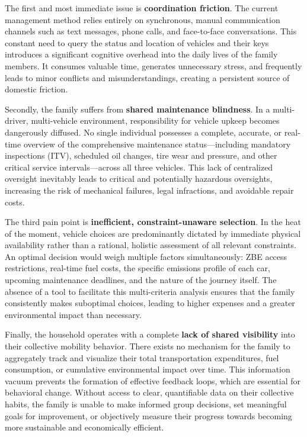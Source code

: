 \textgap

The first and most immediate issue is \textbf{coordination friction}. The current management method relies entirely on synchronous, manual communication channels such as text messages, phone calls, and face-to-face conversations. This constant need to query the status and location of vehicles and their keys introduces a significant cognitive overhead into the daily lives of the family members. It consumes valuable time, generates unnecessary stress, and frequently leads to minor conflicts and misunderstandings, creating a persistent source of domestic friction.

\textgap

Secondly, the family suffers from \textbf{shared maintenance blindness}. In a multi-driver, multi-vehicle environment, responsibility for vehicle upkeep becomes dangerously diffused. No single individual possesses a complete, accurate, or real-time overview of the comprehensive maintenance status—including mandatory inspections (ITV), scheduled oil changes, tire wear and pressure, and other critical service intervals—across all three vehicles. This lack of centralized oversight inevitably leads to critical and potentially hazardous oversights, increasing the risk of mechanical failures, legal infractions, and avoidable repair costs.

\textgap

The third pain point is \textbf{inefficient, constraint-unaware selection}. In the heat of the moment, vehicle choices are predominantly dictated by immediate physical availability rather than a rational, holistic assessment of all relevant constraints. An optimal decision would weigh multiple factors simultaneously: ZBE access restrictions, real-time fuel costs, the specific emissions profile of each car, upcoming maintenance deadlines, and the nature of the journey itself. The absence of a tool to facilitate this multi-criteria analysis ensures that the family consistently makes suboptimal choices, leading to higher expenses and a greater environmental impact than necessary.

\textgap

Finally, the household operates with a complete \textbf{lack of shared visibility} into their collective mobility behavior. There exists no mechanism for the family to aggregately track and visualize their total transportation expenditures, fuel consumption, or cumulative environmental impact over time. This information vacuum prevents the formation of effective feedback loops, which are essential for behavioral change. Without access to clear, quantifiable data on their collective habits, the family is unable to make informed group decisions, set meaningful goals for improvement, or objectively measure their progress towards becoming more sustainable and economically efficient.


